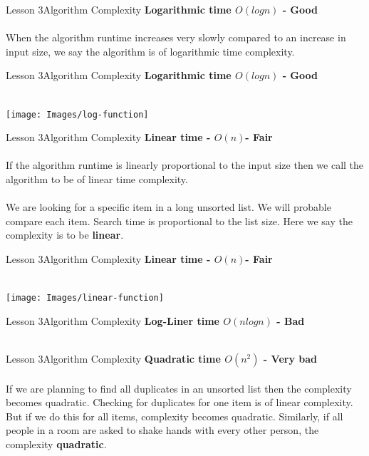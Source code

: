 \documentclass[aspectratio=1610]{beamer}
\begin{document}
\begin{frame}{Lesson 3}{Algorithm Complexity}
\LARGE
\textbf{Logarithmic time $O(log n)$ - Good}\\~\\
When the algorithm runtime increases very slowly compared to an increase 
in input size, we say the algorithm is of logarithmic time complexity.
\end{frame}


\begin{frame}{Lesson 3}{Algorithm Complexity}
\LARGE
\textbf{Logarithmic time $O(log n)$ - Good}\\~\\
\begin{center}
\texttt{[image: Images/log-function]}
\end{center}
\end{frame}


\begin{frame}{Lesson 3}{Algorithm Complexity}
\LARGE
\textbf{Linear time - $O(n)$- Fair}\\~\\
If the algorithm runtime is linearly proportional to the input size then we call 
the algorithm to be of linear time complexity.
\\~\\
\Large
We are looking for a specific item in a long unsorted list. We will probable
compare each item. Search time is proportional to the list size. Here we say the
complexity is to be \textbf{linear}.
\end{frame}


\begin{frame}{Lesson 3}{Algorithm Complexity}
\LARGE
\textbf{Linear time - $O(n)$- Fair}\\~\\
\begin{center}
\texttt{[image: Images/linear-function]}
\end{center}
\end{frame}


\begin{frame}{Lesson 3}{Algorithm Complexity}
\LARGE
\textbf{Log-Liner time $O(n log n)$ - Bad}\\~\\
\end{frame}


\begin{frame}{Lesson 3}{Algorithm Complexity}
\LARGE
\textbf{Quadratic time $O(n^2)$ - Very bad}\\~\\
If we are planning to find all duplicates in an unsorted list then the complexity
becomes quadratic. Checking for duplicates for one item is of linear complexity.
But if we do this for all items, complexity becomes quadratic. Similarly, if all
people in a room are asked to shake hands with every other person, the complexity 
\textbf{quadratic}.
\end{frame}
\end{document}
